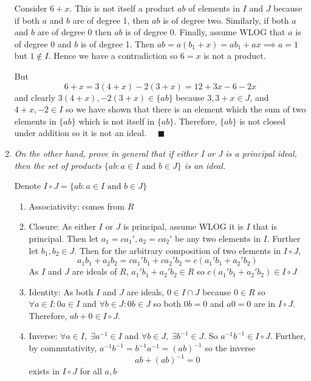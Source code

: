 \documentclass[12pt]{article}
\newcommand{\qed}{\quad \blacksquare}
\begin{document}
\begin{enumerate}[label=(\alph*)]
                Consider $6 + x$. This is not itself a product $ab$ of elements in $I$ and $J$ because if both $a$ and $b$ are of degree 1, then $ab$ is of degree two. Similarly, if both $a$ and $b$ are of degree $0$ then $ab$ is of degree 0. Finally, assume WLOG that $a$ is of degree $0$ and $b$ is of degree 1. Then $ab = a(b_1 + x) = ab_1 + ax \implies a = 1$ but $1 \not \in I$. Hence we have a contradiction so $6 = x$ is not a product. 

                But 
                \[6 + x = 3(4 + x) - 2(3 + x)= 12 +3x - 6 - 2x\]
                and clearly $3(4 + x), -2(3 + x) \in \{ab\}$ because $3, 3 + x \in J$, and $4 + x, -2\in I$ so we have shown that there is an element which the sum of two elements in $\{ab\}$ which is not itself in $\{ab\}$. Therefore, $\{ab\}$ is not closed under addition so it is not an ideal. $\qed$                
            \color{black}

        \item \emph{On the other hand, prove in general that if either I or J is a principal ideal, then the set of products $\{ab : a \in I \text{ and } b \in J\}$ is an ideal.}
        
            \color{blue}
                Denote $I \circ J = \{ab: a \in I \text{ and } b \in J\}$
                \begin{enumerate}
                    \item Associativity: comes from $R$ 
                    
                    \item Closure: As either $I$ or $J$ is principal, assume WLOG it is $I$ that is principal. Then let $a_1 = ca_1', a_2 = ca_2'$ be any two elements in $I$. Further let $b_1, b_2 \in J$. Then for the arbitrary composition of two elements in $I \circ J$, 
                    \[a_1b_1 + a_2b_2 = ca_1'b_1 + ca_2'b_2 = c(a_1'b_1 + a_2'b_2)\]
                    As $I$ and $J$ are ideals of $R$, $a_1'b_1 + a_2'b_2 \in R$ so $c(a_1'b_1 + a_2'b_2) \in I \circ J$ 

                    \item Identity: As both $I$ and $J$ are ideals, $0 \in I \cap J$ because $0\in R$ so $\forall a \in I: 0a \in I$ and $\forall b \in J: 0b \in J$ so both $0b = 0$ and $a0 = 0$ are in $I\circ J$. Therefore, $ab + 0 \in I\circ J$.

                    \item Inverse: $\forall a \in I, \; \exists a^{-1} \in I$ and $\forall b \in J,\; \exists b^{-1} \in J$. So $a^{-1}b^{-1} \in I\circ J$. Further, by commutativity, $a^{-1}b^{-1} = b^{-1}a^{-1} = (ab)^{-1}$ so the inverse
                    \[ab + (ab)^{-1} = 0\] 
                    exists in $I\circ J$ for all $a, b$


\end{enumerate}
\end{enumerate}
\end{document}
